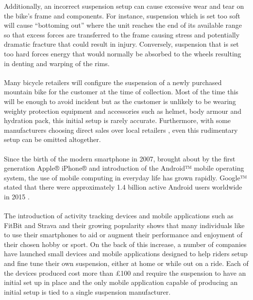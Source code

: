 	Additionally, an incorrect suspension setup can cause excessive wear and tear on the	bike’s frame and components. For instance, suspension which is set too soft will cause “bottoming out” where the unit reaches the end of its available range so that excess forces are transferred to the frame causing stress and potentially dramatic fracture that could result in injury. Conversely, suspension that is set too hard forces energy that would normally be absorbed to the wheels resulting in denting and warping of the rims.
	\\\\
	Many bicycle retailers will configure the suspension of a newly purchased mountain bike for the customer at the time of collection. Most of the time this will be enough to avoid incident but as the customer is unlikely to be wearing weighty protection equipment and accessories such as helmet, body armour and hydration pack, this initial setup is rarely accurate. Furthermore, with some manufacturers choosing direct sales over
	local retailers \citep{roseonline,ytonline}, even this rudimentary setup can be omitted altogether.
	\\\\
	Since the birth of the modern smartphone in 2007, brought about by the first generation Apple® iPhone® and introduction of the Android™ mobile operating system, the use of mobile computing in everyday life has grown rapidly. Google™ stated that there were approximately 1.4 billion active Android users worldwide in 2015 \citep{androidusers}.
	\\\\
	The introduction of activity tracking devices and mobile applications such as FitBit \citep{fitbit} and Strava \citep{strava} and their growing popularity \citep{apppopularity} shows that many individuals like to  use  their smartphones to aid or augment their performance and enjoyment of their chosen  hobby or sport. On the back of this increase, a number of companies have launched small devices \citep{sussmybike, shockwiztrademark} and mobile applications \citep{foxird} designed to help riders setup and fine tune their own suspension, either at home or while out on a ride. Each of the devices produced cost more than £100 and require the suspension to have an initial set up in place and the only mobile application capable of producing an initial setup is tied to a single suspension manufacturer.
